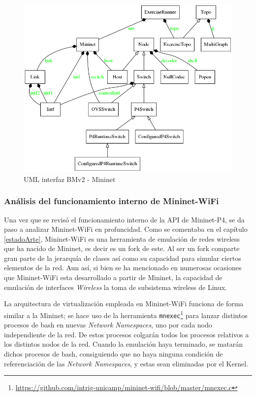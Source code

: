 \begin{figure}[h!]
    \centering
    \includegraphics[width=13.5cm]{archivos/img/dev/p4-wifi/analysis/run_exercise_class_names_only.png}
    \caption{UML interfaz BMv2 - Mininet}
    \label{fig:analysis_p4_wifi_2}
\end{figure}



\subsubsection{Análisis del funcionamiento interno de Mininet-WiFi}

Una vez que se revisó el funcionamiento interno de la API de Mininet-P4, se da paso a analizar Mininet-WiFi en profuncidad. Como se comentaba en el capítulo \ref{estadoArte}, Mininet-WiFi es una herramienta de emulación de redes wireless que ha nacido de Mininet, es decir es un fork de este. Al ser un fork comparte gran parte de la jerarquía de clases así como su capacidad para simular ciertos elementos de la red. Aun así, si bien se ha mencionado en numerosas ocasiones que Mininet-WiFi esta desarrollado a partir de Mininet, la capacidad de emulación de interfaces \textit{Wireless} la toma de subsistema wireless de Linux.\\
\par

La arquitectura de virtualización empleada en Mininet-WiFi funciona de forma similar a la Mininet; se hace uso de la herramienta \texttt{mnexec}\footnote{\url{https://github.com/intrig-unicamp/mininet-wifi/blob/master/mnexec.c}} para lanzar distintos procesos de bash en nuevas \textit{Network Namespaces}, uno por cada nodo independiente de la red. De estos procesos colgarán todos los procesos relativos a los distintos nodos de la red. Cuando la emulación haya terminado, se matarán dichos procesos de bash, consiguiendo que no haya ninguna condición de referenciación de las \textit{Network Namespaces}, y estas sean eliminadas por el Kernel.\\
\par

